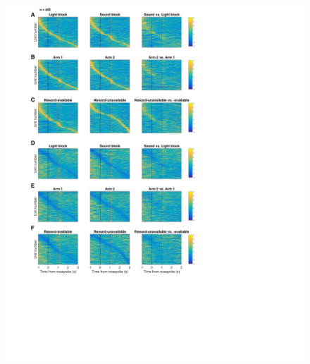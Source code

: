 \documentclass[11pt]{article}
\begin{document}
\begin{figure}[h]
\centering
\includegraphics[height=0.5\textheight]{Fig 12 - NP task tiling.png}

\end{figure}
\end{document}
